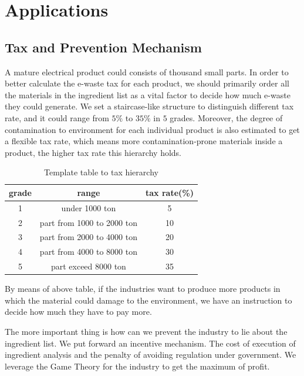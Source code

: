 \section{Applications}

\subsection{Tax and Prevention Mechanism}

A mature electrical product could consists of thousand small parts. In order to better 
calculate the e-waste tax for each product, we should primarily order all the materials 
in the ingredient list as a vital factor to decide how much e-waste they could generate. 
We set a staircase-like structure to distinguish different tax rate, and it could range from $5\%$ to $35\%$ in $5$ grades.
Moreover, the degree of contamination to environment for each individual product is also estimated to get a flexible tax rate, 
which means more contamination-prone materials inside a product, the higher tax rate this hierarchy holds.

\begin{center}
\begin{table}
\begin{tabular}{ccc}
	\toprule
	grade	& range 					& tax rate(\%)\\
	\midrule
	1		& under 1000 ton 			& 5 \\
	2		& part from 1000 to 2000 ton & 10 \\
	3		& part from 2000 to 4000 ton & 20 \\
	4		& part from 4000 to 8000 ton & 30 \\
	5		& part exceed 8000 ton & 35 \\
	\bottomrule
\end{tabular}
\caption{Template table to tax hierarchy}
\label{table:1}
\end{table}
\end{center}

By means of above table, if the industries want to produce more products in which the material could damage to the environment, we have an instruction 
to decide how much they have to pay more. 

The more important thing is how can we prevent the industry to lie about the ingredient list. 
We put forward an incentive mechanism. The cost of execution of ingredient analysis and the penalty 
of avoiding regulation under government. We leverage the Game Theory for the industry to get the maximum of profit.

